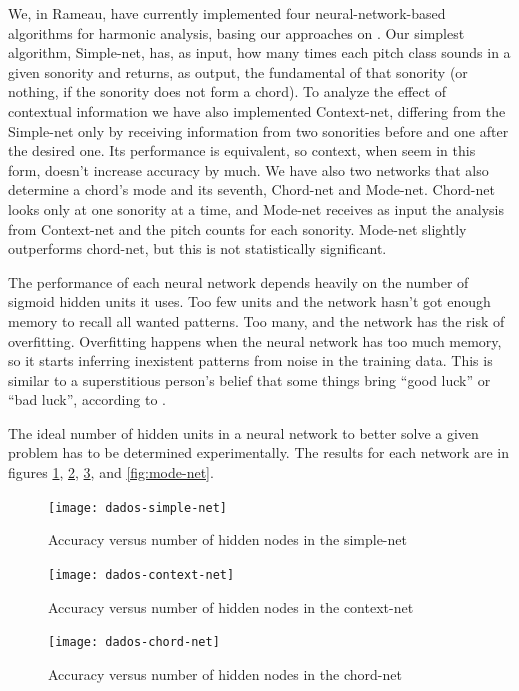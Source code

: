\documentclass{article}
\begin{document}
We, in Rameau, have currently implemented four neural-network-based
algorithms for harmonic analysis, basing our approaches on
\cite{tsui02:_harmon_analy_using_neural_networ}. Our simplest
algorithm, Simple-net, has, as input, how many times each pitch class
sounds in a given sonority and returns, as output, the fundamental of
that sonority (or nothing, if the sonority does not form a chord). To
analyze the effect of contextual information we have also implemented
Context-net, differing from the Simple-net only by receiving
information from two sonorities before and one after the desired
one. Its performance is equivalent, so context, when seem in this
form, doesn't increase accuracy by much. We have also two networks
that also determine a chord's mode and its seventh, Chord-net and
Mode-net. Chord-net looks only at one sonority at a time, and Mode-net
receives as input the analysis from Context-net and the pitch counts
for each sonority. Mode-net slightly outperforms chord-net, but this
is not statistically significant.

The performance of each neural network depends heavily on the number
of sigmoid hidden units it uses. Too few units and the network hasn't
got enough memory to recall all wanted patterns. Too many, and the
network has the risk of overfitting. Overfitting happens when the
neural network has too much memory, so it starts inferring inexistent
patterns from noise in the training data. This is similar to a
superstitious person's belief that some things bring ``good luck'' or
``bad luck'', according to \cite{white95:superstitious}. 

The ideal number of hidden units in a neural network to better solve a
given problem has to be determined experimentally. The results for
each network are in figures \ref{fig:simple-net},
\ref{fig:context-net}, \ref{fig:chord-net}, and \ref{fig:mode-net}.

\begin{figure}
  \texttt{[image: dados-simple-net]}
  \caption{Accuracy versus number of hidden nodes in the simple-net}
  \label{fig:simple-net}
\end{figure}

\begin{figure}
  \texttt{[image: dados-context-net]}
  \caption{Accuracy versus number of hidden nodes in the context-net}
  \label{fig:context-net}
\end{figure}

\begin{figure}
  \texttt{[image: dados-chord-net]}
  \caption{Accuracy versus number of hidden nodes in the chord-net}
  \label{fig:chord-net}
\end{figure}
\end{document}
